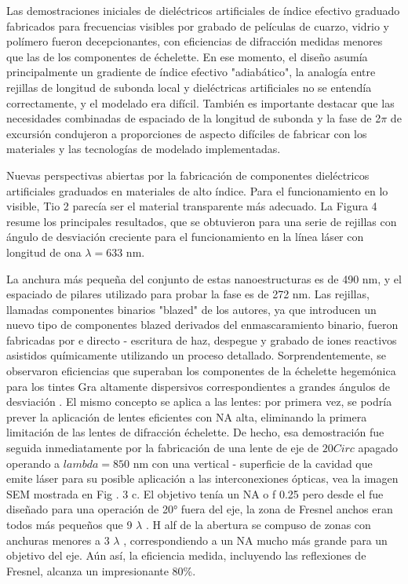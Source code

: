 \documentclass[a4paper, twocolumn, 10pt]{article}
\begin{document}
\noindent Las demostraciones iniciales de dieléctricos artificiales de índice efectivo graduado fabricados para frecuencias visibles por grabado de películas de cuarzo, vidrio y polímero fueron decepcionantes, con eficiencias de difracción medidas menores que las de los componentes de échelette. En ese momento, el diseño asumía principalmente un gradiente de índice efectivo "adiabático", la analogía entre rejillas de longitud de subonda local y dieléctricas artificiales no se entendía correctamente, y el modelado era difícil. También es importante destacar que las necesidades combinadas de espaciado de la longitud de subonda y la fase de 2$ \pi$ de excursión condujeron a proporciones de aspecto difíciles de fabricar con los materiales y las tecnologías de modelado implementadas.

\noindent Nuevas perspectivas abiertas por la fabricación de componentes dieléctricos artificiales graduados en materiales de alto índice. Para el funcionamiento en lo visible, Tio 2 parecía ser el material transparente más adecuado. La Figura 4 resume los principales resultados, que se obtuvieron para una serie de rejillas con ángulo de desviación creciente para el funcionamiento en la línea láser con longitud de ona $ \lambda = 633$ nm.

\noindent La anchura más pequeña del conjunto de estas nanoestructuras es de 490 nm, y el espaciado de pilares utilizado para probar la fase es de 272 nm. Las rejillas, llamadas componentes binarios "blazed" de los autores, ya que introducen un nuevo tipo de componentes blazed derivados del enmascaramiento binario, fueron fabricadas por e directo - escritura de haz, despegue y grabado de iones reactivos asistidos químicamente utilizando un proceso detallado. Sorprendentemente, se observaron eficiencias que superaban los componentes de la échelette hegemónica para los tintes Gra altamente dispersivos correspondientes a grandes ángulos de desviación . El mismo concepto se aplica a las lentes: por primera vez, se podría prever la aplicación de lentes eficientes con NA alta, eliminando la primera limitación de las lentes de difracción échelette.
De hecho, esa demostración fue seguida inmediatamente por la fabricación de una lente de eje de $ 20 Circ$ apagado operando a $ lambda = 850$ nm con una vertical - superficie de la cavidad que emite láser para su posible aplicación a las interconexiones ópticas, vea la imagen SEM mostrada en Fig . 3 c. El objetivo tenía un NA o f 0.25 pero desde el fue diseñado para una operación de 20° fuera del eje, la zona de Fresnel anchos eran todos más pequeños que 9 $ \lambda$ . H alf de la abertura se compuso de zonas con anchuras menores a 3 $ \lambda$ , correspondiendo a un NA mucho más grande para un objetivo del eje. Aún así, la eficiencia medida, incluyendo las reflexiones de Fresnel, alcanza un impresionante 80\%.
\end{document}
